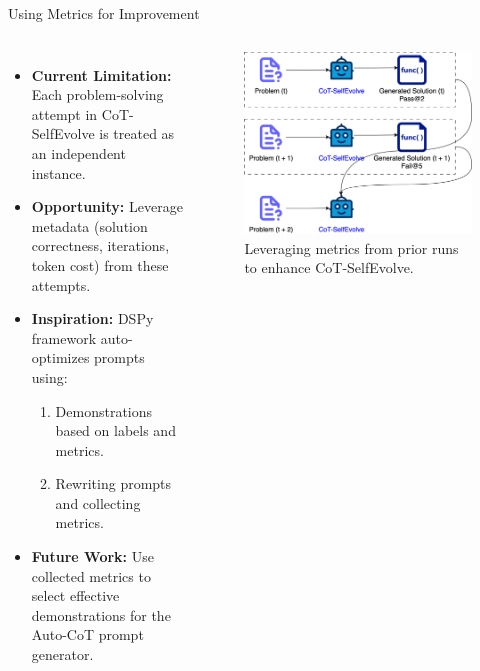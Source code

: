\begin{frame}{Using Metrics for Improvement}
    \begin{columns}
        \begin{itemize}
            \item \textbf{Current Limitation:} Each problem-solving attempt in CoT-SelfEvolve is treated as an independent instance.

            \item \textbf{Opportunity:} Leverage metadata (solution correctness, iterations, token cost) from these attempts.

            \item \textbf{Inspiration:} DSPy~\cite{khattab2023dspy} framework auto-optimizes prompts using:
                  \begin{enumerate}
                      \item Demonstrations based on labels and metrics.
                      \item Rewriting prompts and collecting metrics.
                  \end{enumerate}

            \item \textbf{Future Work:} Use collected metrics to select effective demonstrations for the Auto-CoT prompt generator.
        \end{itemize}

        \begin{figure}[H]
            \centering
            \includegraphics[width=\columnwidth]{img/enhanced_cot_selfevolve}
            \caption*{Leveraging metrics from prior runs to enhance CoT-SelfEvolve.}
        \end{figure}
    \end{columns}
\end{frame}
